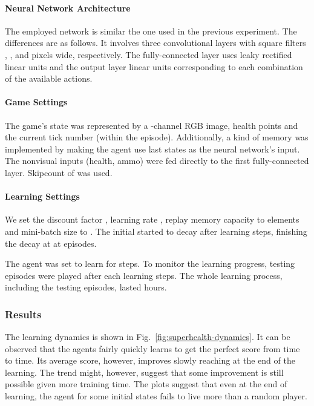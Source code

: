 \documentclass[english,american,conference, balance]{IEEEtran}
\begin{document}
\paragraph{Neural Network Architecture}

  The employed network is similar the one used in the previous experiment.
The differences are as follows. It involves three convolutional layers
with   square filters , , and  pixels wide, respectively.
The fully-connected layer uses  leaky rectified linear units
and the output layer  linear units corresponding to each combination
of the  available actions.

\paragraph{Game Settings}

The game's state was represented by a  -channel
RGB image, health points and the current tick number (within the episode).
 Additionally, a kind of memory was implemented by making the agent
use  last states as the neural network's input. The nonvisual
inputs (health, ammo) were fed directly to the first fully-connected
layer. Skipcount of  was used.

\paragraph{Learning Settings}

We set the discount factor , learning rate ,
replay memory capacity to  elements and mini-batch size
to . The initial  started to decay after 
learning steps, finishing the decay at  at 
episodes.

The agent was set to learn for  steps. To monitor the
learning progress,  testing episodes were played after each
 learning steps. The whole learning process, including the
testing episodes, lasted  hours.

\subsubsection{Results}

The learning dynamics is shown in Fig.~\ref{fig:superhealth-dynamics}.
It can be observed that the agents fairly quickly learns to get the
perfect score from time to time. Its average score, however, improves
slowly reaching  at the end of the learning. The trend might,
however, suggest that some improvement is still possible given more
training time. The plots suggest that even at the end of learning,
the agent for some initial states fails to live more than a random
player. 
\end{document}
